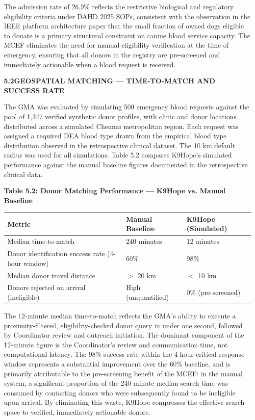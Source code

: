 \documentclass[12pt,a4paper]{article}
\begin{document}
\noindent The admission rate of 26.9\% reflects the restrictive biological and regulatory eligibility criteria under DAHD 2025 SOPs, consistent with the observation in the IEEE platform architecture paper that the small fraction of owned dogs eligible to donate is a primary structural constraint on canine blood service capacity. The MCEF eliminates the need for manual eligibility verification at the time of emergency, ensuring that all donors in the registry are pre-screened and immediately actionable when a blood request is received.

\vspace{2em}
\noindent\textbf{5.2\quad GEOSPATIAL MATCHING — TIME-TO-MATCH AND SUCCESS RATE}
\vspace{0.8em}

\noindent The GMA was evaluated by simulating 500 emergency blood requests against the pool of 1,347 verified synthetic donor profiles, with clinic and donor locations distributed across a simulated Chennai metropolitan region. Each request was assigned a required DEA blood type drawn from the empirical blood type distribution observed in the retrospective clinical dataset. The 10 km default radius was used for all simulations. Table 5.2 compares K9Hope's simulated performance against the manual baseline figures documented in the retrospective clinical data.

\begin{center}
\textbf{Table 5.2: Donor Matching Performance — K9Hope vs. Manual Baseline}
\vspace{0.4em}
\begin{tabular}{lll}
\toprule
\textbf{Metric} & \textbf{Manual Baseline} & \textbf{K9Hope (Simulated)} \\
\midrule
Median time-to-match & 240 minutes & 12 minutes \\
Donor identification success rate (4-hour window) & 60\% & 98\% \\
Median donor travel distance & $>$ 20 km & $<$ 10 km \\
Donors rejected on arrival (ineligible) & High (unquantified) & 0\% (pre-screened) \\
\bottomrule
\end{tabular}
\end{center}

\noindent The 12-minute median time-to-match reflects the GMA's ability to execute a proximity-filtered, eligibility-checked donor query in under one second, followed by Coordinator review and outreach initiation. The dominant component of the 12-minute figure is the Coordinator's review and communication time, not computational latency. The 98\% success rate within the 4-hour critical response window represents a substantial improvement over the 60\% baseline, and is primarily attributable to the pre-screening benefit of the MCEF: in the manual system, a significant proportion of the 240-minute median search time was consumed by contacting donors who were subsequently found to be ineligible upon arrival. By eliminating this waste, K9Hope compresses the effective search space to verified, immediately actionable donors.
\end{document}
